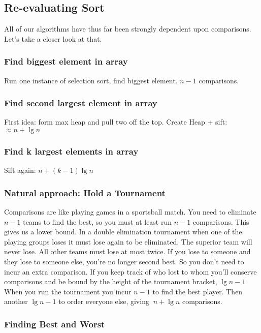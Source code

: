 \documentclass[english, 10pt]{article}
\begin{document}
\subsection{Re-evaluating Sort}
All of our algorithms have thus far been strongly dependent upon comparisons.
Let's take a closer look at that.

\subsubsection{Find biggest element in array}
Run one instance of selection sort, find biggest element. $n-1$ comparisons.

\subsubsection{Find second largest element in array}

First idea: form max heap and pull two off the top. Create Heap + sift: $\approx n + \lg n$

\subsubsection{Find k largest elements in array}

Sift again: $n+ (k-1)\lg n$

\subsubsection{Natural approach: Hold a Tournament}

Comparisons are like playing games in a sportsball match. You need to eliminate
$n-1$ teams to find the best, so you must at least run $n-1$ comparisons.  This
gives us a lower bound. In a double elimination tournament when one of the
playing groups loses it must lose again to be eliminated. The superior team
will never lose. All other teams must lose at most twice. If you lose to
someone and they lose to someone else, you're no longer second best. So you
don't need to incur an extra comparison.  If you keep track of who lost to whom
you'll conserve comparisons and be bound by the height of the tournament
bracket, $\lg n-1$ When you run the tournament you incur $n-1$ to find the best
player. Then another $\lg n -1$ to order everyone else, giving $~n+\lg n$
comparisons.

\subsubsection{Finding Best and Worst}
\end{document}
